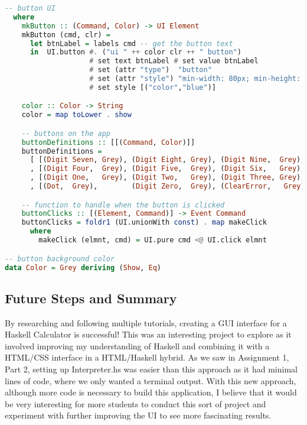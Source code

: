 \documentclass{article}
\begin{document}
\begin{lstlisting}[language=Haskell]
-- button UI
  where
    mkButton :: (Command, Color) -> UI Element
    mkButton (cmd, clr) =
      let btnLabel = labels cmd -- get the button text
      in  UI.button #. ("ui " ++ color clr ++ " button")
                    # set text btnLabel # set value btnLabel
                    # set (attr "type")  "button"
                    # set (attr "style") "min-width: 80px; min-height: 60px; font-size: 24px"
                    # set style [("color","blue")]

    color :: Color -> String
    color = map toLower . show

    -- buttons on the app
    buttonDefinitions :: [[(Command, Color)]]
    buttonDefinitions =
      [ [(Digit Seven, Grey), (Digit Eight, Grey), (Digit Nine,  Grey), (Operation Add, Grey), (Operation Sub, Grey)]
      , [(Digit Four,  Grey), (Digit Five,  Grey), (Digit Six,   Grey), (Operation Mul, Grey), (Operation Div, Grey)]
      , [(Digit One,   Grey), (Digit Two,   Grey), (Digit Three, Grey), (Operation Exp, Grey), (Operation Mod, Grey)]
      , [(Dot,  Grey),        (Digit Zero,  Grey), (ClearError,   Grey), (Clear,        Grey), (Equal, Grey)] ]

    -- function to handle when the button is clicked
    buttonClicks :: [(Element, Command)] -> Event Command
    buttonClicks = foldr1 (UI.unionWith const) . map makeClick
      where
        makeClick (elmnt, cmd) = UI.pure cmd <@ UI.click elmnt

-- button background color
data Color = Grey deriving (Show, Eq)  
\end{lstlisting}  

\subsection{Future Steps and Summary}
By researching and following multiple tutorials, creating a GUI interface for a Haskell Calculator is successful! This was an interesting project to explore as it involved improving my understanding of Haskell and combining it with a HTML/CSS interface in a HTML/Haskell hybrid. As we saw in Assignment 1, Part 2, setting up Interpreter.hs was easier than this approach as it had minimal lines of code, where we only wanted a terminal output. With this new approach, although more code is necessary to build this application, I believe that it would be very interesting for more students to conduct this sort of project and experiment with further improving the UI to see more fascinating results. 
  
\end{document}
